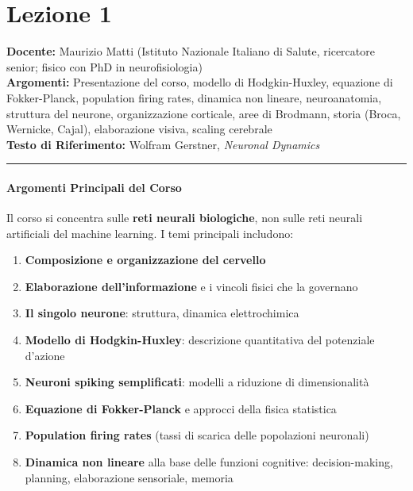 \chapter{Lezione 1}

\textbf{Docente:} Maurizio Matti (Istituto Nazionale Italiano di Salute, ricercatore senior; fisico con PhD in neurofisiologia)\\
\textbf{Argomenti:} Presentazione del corso, modello di Hodgkin-Huxley, equazione di Fokker-Planck, population firing rates, dinamica non lineare, neuroanatomia, struttura del neurone, organizzazione corticale, aree di Brodmann, storia (Broca, Wernicke, Cajal), elaborazione visiva, scaling cerebrale\\
\textbf{Testo di Riferimento:} Wolfram Gerstner, \textit{Neuronal Dynamics}


\vspace{0.5cm}
\noindent\rule{\textwidth}{0.4pt}


\subsubsection{Argomenti Principali del Corso}

Il corso si concentra sulle \textbf{reti neurali biologiche}, non sulle reti neurali artificiali del machine learning. I temi principali includono:

\begin{enumerate}
    \item \textbf{Composizione e organizzazione del cervello}
    \item \textbf{Elaborazione dell'informazione} e i vincoli fisici che la governano
    \item \textbf{Il singolo neurone}: struttura, dinamica elettrochimica
    \item \textbf{Modello di Hodgkin-Huxley}: descrizione quantitativa del potenziale d'azione
    \item \textbf{Neuroni spiking semplificati}: modelli a riduzione di dimensionalità
    \item \textbf{Equazione di Fokker-Planck} e approcci della fisica statistica
    \item \textbf{Population firing rates} (tassi di scarica delle popolazioni neuronali)
    \item \textbf{Dinamica non lineare} alla base delle funzioni cognitive: decision-making, planning, elaborazione sensoriale, memoria
\end{enumerate}


